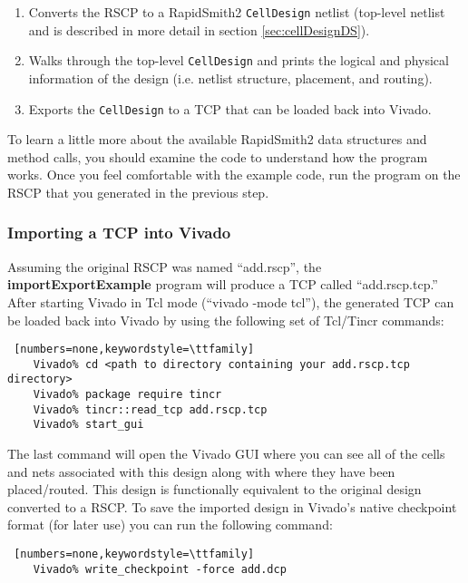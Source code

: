 \begin{enumerate}
  \item Converts the RSCP to a RapidSmith2 \texttt{CellDesign} netlist
  (top-level netlist and is described in more detail in section
  \ref{sec:cellDesignDS}).
  
  \item Walks through the top-level \texttt{CellDesign} and prints the logical
  and physical information of the design (i.e. netlist structure, placement,
  and routing).
  
  \item Exports the \texttt{CellDesign} to a TCP that can be loaded back into
  Vivado.
  
\end{enumerate}
 
\noindent To learn a little more about the available RapidSmith2 data structures
and method calls, you should examine the code to understand how the program
works. Once you feel comfortable with the example code, run the program on the
RSCP that you generated in the previous step. 

\subsubsection{Importing a TCP into Vivado}
Assuming the original RSCP was named ``add.rscp'', the
\textbf{importExportExample} program will produce a TCP called
``add.rscp.tcp.'' After starting Vivado in Tcl mode (``vivado -mode tcl''),
the generated TCP can be loaded back into Vivado by using the following set of
Tcl/Tincr commands:

\begin{lstlisting} [numbers=none,keywordstyle=\ttfamily]
	Vivado% cd <path to directory containing your add.rscp.tcp directory>
	Vivado% package require tincr
	Vivado% tincr::read_tcp add.rscp.tcp
	Vivado% start_gui
\end{lstlisting}

\noindent The last command will open the Vivado GUI where you can see all of the 
cells and nets associated with this design along with where they have been
placed/routed. This design is functionally equivalent to the original design
converted to a RSCP. To save the imported design in Vivado's native checkpoint
format (for later use) you can run the following command:

\begin{lstlisting} [numbers=none,keywordstyle=\ttfamily]
	Vivado% write_checkpoint -force add.dcp
\end{lstlisting}


